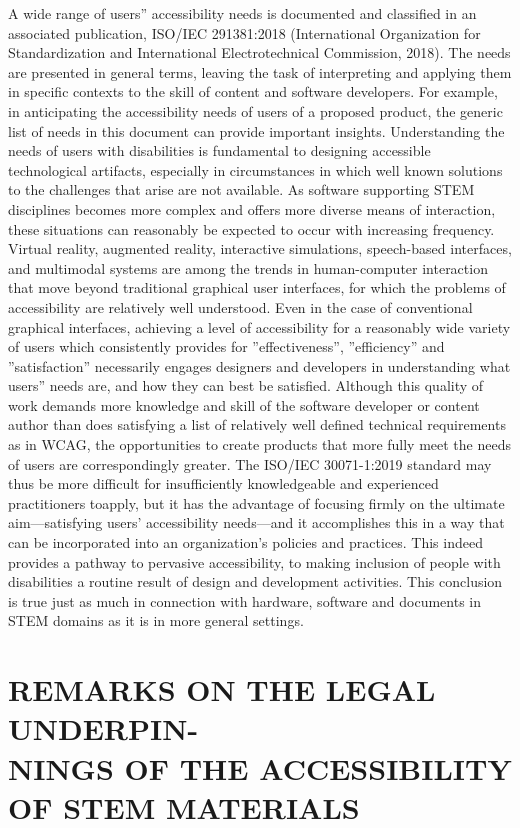\documentclass{sig-alternate} %
\begin{document}
\begin{large}
A wide range of users” accessibility needs is documented and classified in an associated publication, ISO/IEC 291381:2018 (International Organization for Standardization and International Electrotechnical Commission, 2018). The needs are presented in general terms, leaving the task of interpreting and applying them in specific contexts to the skill of content and software developers. For example, in anticipating the accessibility needs of users of a proposed product, the generic list of needs in this document can provide important insights. Understanding the needs of users with disabilities is fundamental to designing accessible technological artifacts, especially in circumstances in which well known solutions to the challenges that arise are not available. As software supporting STEM disciplines becomes more complex and offers more diverse means of interaction, these situations can reasonably be expected to occur with increasing frequency. Virtual reality, augmented reality, interactive simulations, speech-based interfaces, and multimodal systems are among the trends in human-computer interaction that move beyond traditional graphical user interfaces, for which the problems of accessibility are relatively well understood. Even in the case of conventional graphical interfaces, achieving a level of accessibility for a reasonably wide variety of users which consistently provides for ”effectiveness”, ”efficiency” and ”satisfaction” necessarily engages designers and developers in understanding what users” needs are, and how they can best be satisfied. Although this quality of work demands more knowledge and skill of the software developer or content author than does satisfying a list of relatively well defined technical requirements as in WCAG, the opportunities to create products that more fully meet the needs of users are correspondingly greater. The ISO/IEC 30071-1:2019 standard may thus be more difficult for insufficiently knowledgeable and experienced practitioners toapply, but it has the advantage of focusing firmly on the ultimate aim—satisfying users’ accessibility needs—and it accomplishes this in a way that can be incorporated into an organization’s policies and practices. This indeed provides a pathway to pervasive accessibility, to making inclusion of people with disabilities a routine result of design and development activities. This conclusion is true just as much in connection with hardware, software and documents in STEM domains as it is in more general settings.


\section*{REMARKS ON THE LEGAL UNDERPIN- \\NINGS OF THE ACCESSIBILITY OF STEM MATERIALS}


\end{large}
\end{document}

